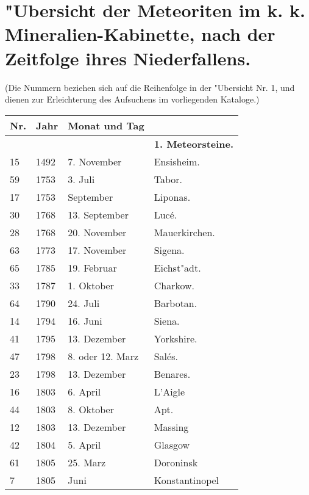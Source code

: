 \documentclass[a4paper, 11pt, oneside, polutonikogreek, german]{article}
\begin{document}
\section{"Ubersicht der Meteoriten im k. k. Mineralien-Kabinette, nach der Zeitfolge ihres Niederfallens.}
\begin{center}
\small
(Die Nummern beziehen sich auf die Reihenfolge in der "Ubersicht Nr. 1, und dienen zur Erleichterung des Aufsuchens im vorliegenden Kataloge.)
\end{center}
\begin{center}
    \footnotesize
    \begin{longtable}{|p{6mm}|p{9mm}|p{60mm}|p{27mm}|}
    \hline
        Nr. & Jahr & Monat und Tag &   \\ \hline
        ~ & ~ & ~ & \textbf{1. Meteorsteine.} \\ \hline
        15 & 1492 & 7. November & Ensisheim. \\ \hline
        59 & 1753 & 3. Juli & Tabor. \\ \hline
        17 & 1753 & September & Liponas. \\ \hline
        30 & 1768 & 13. September & Lucé. \\ \hline
        28 & 1768 & 20. November & Mauerkirchen. \\ \hline
        63 & 1773 & 17. November & Sigena. \\ \hline
        65 & 1785 & 19. Februar & Eichst"adt. \\ \hline
        33 & 1787 & 1. Oktober & Charkow. \\ \hline
        64 & 1790 & 24. Juli & Barbotan. \\ \hline
        14 & 1794 & 16. Juni & Siena. \\ \hline
        41 & 1795 & 13. Dezember & Yorkshire. \\ \hline
        47 & 1798 & 8. oder 12. Marz & Salés. \\ \hline
        23 & 1798 & 13. Dezember & Benares. \\ \hline
        16 & 1803 & 6. April & L’Aigle \\ \hline
        44 & 1803 & 8. Oktober & Apt. \\ \hline
        12 & 1803 & 13. Dezember & Massing \\ \hline
        42 & 1804 & 5. April & Glasgow \\ \hline
        61 & 1805 & 25. Marz & Doroninsk \\ \hline
        7 & 1805 & Juni & Konstantinopel \\ \hline

\end{longtable}
\end{center}
\end{document}
